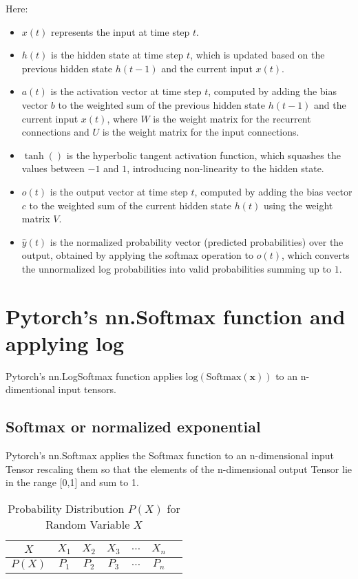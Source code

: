 Here:
\begin{itemize}
  \item $x(t)$ represents the input at time step $t$.
  \item $h(t)$ is the hidden state at time step $t$, which is updated based on the previous hidden state $h(t-1)$ and the current input $x(t)$.
  \item $a(t)$ is the activation vector at time step $t$, computed by adding the bias vector $b$ to the weighted sum of the previous hidden state $h(t-1)$ and the current input $x(t)$, where $W$ is the weight matrix for the recurrent connections and $U$ is the weight matrix for the input connections.
  \item $\tanh()$ is the hyperbolic tangent activation function, which squashes the values between $-1$ and $1$, introducing non-linearity to the hidden state.
  \item $o(t)$ is the output vector at time step $t$, computed by adding the bias vector $c$ to the weighted sum of the current hidden state $h(t)$ using the weight matrix $V$.
  \item $\hat{y}(t)$ is the normalized probability vector (predicted probabilities) over the output, obtained by applying the softmax operation to $o(t)$, which converts the unnormalized log probabilities into valid probabilities summing up to $1$.
\end{itemize}



\section{Pytorch's nn.Softmax function and applying log }

Pytorch's nn.LogSoftmax function applies $\text{log}\left(\text{Softmax}(\mathbf{x})\right)$ to an n-dimentional input tensors. \\



\subsection{Softmax or normalized exponential \parencite{Book-Bishop-Neural}}

Pytorch's nn.Softmax applies the Softmax function to an n-dimensional input Tensor rescaling them so that the elements of the n-dimensional output Tensor lie in the range [0,1] and sum to 1.

\begin{table}[h]
    \centering
    \begin{tabular}{ccccccc}
        \hline
        $X$ & $X_1$ & $X_2$ & $X_3$ & $\dots$ & $X_n$ \\
        \hline
        $P(X)$ & $P_1$ & $P_2$ & $P_3$ & $\dots$ & $P_n$ \\
        \hline
    \end{tabular}
    \caption{Probability Distribution $P(X)$ for Random Variable $X$}
    \label{tab:probability-distribution}
\end{table}

